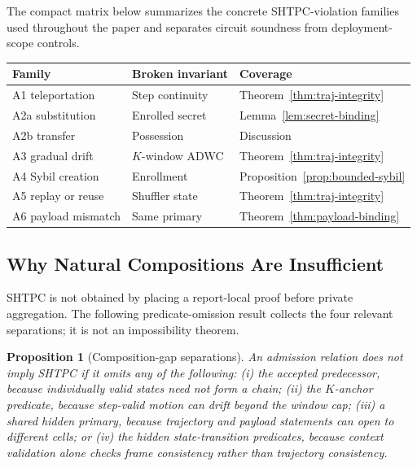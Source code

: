 \documentclass[journal]{IEEEtran}
\theoremstyle{definition}
\theoremstyle{plain}
\newtheorem{proposition}{Proposition}
\begin{document}
The compact matrix below summarizes the concrete SHTPC-violation families used
throughout the paper and separates circuit soundness from deployment-scope
controls.
\begin{center}
  \scriptsize
  \setlength{\tabcolsep}{2.2pt}
  \renewcommand{\arraystretch}{1.0}
  \begin{tabularx}{\columnwidth}{@{}p{1.75cm}p{2.05cm}X@{}}
    \toprule
    Family & Broken invariant & Coverage \\
    \midrule
    A1 teleportation & Step continuity & Theorem~\ref{thm:traj-integrity} \\
    A2a substitution & Enrolled secret & Lemma~\ref{lem:secret-binding} \\
    A2b transfer & Possession & Discussion \\
    A3 gradual drift & \(K\)-window ADWC & Theorem~\ref{thm:traj-integrity} \\
    A4 Sybil creation & Enrollment & Proposition~\ref{prop:bounded-sybil} \\
    A5 replay or reuse & Shuffler state & Theorem~\ref{thm:traj-integrity} \\
    A6 payload mismatch & Same primary & Theorem~\ref{thm:payload-binding} \\
    \bottomrule
  \end{tabularx}
\end{center}

\subsection{Why Natural Compositions Are Insufficient}
\label{sec:composition-failures}

SHTPC is not obtained by placing a report-local proof before private
aggregation. The following predicate-omission result collects the four relevant
separations; it is not an impossibility theorem.

\begin{proposition}[Composition-gap separations]
  \label{prop:composition-separations}
  An admission relation does not imply SHTPC if it omits any of the following:
  (i) the accepted predecessor, because individually valid states need not form
  a chain; (ii) the \(K\)-anchor predicate, because step-valid motion can drift
  beyond the window cap; (iii) a shared hidden primary, because trajectory and
  payload statements can open to different cells; or (iv) the hidden
  state-transition predicates, because context validation alone checks frame
  consistency rather than trajectory consistency.
\end{proposition}
\end{document}

